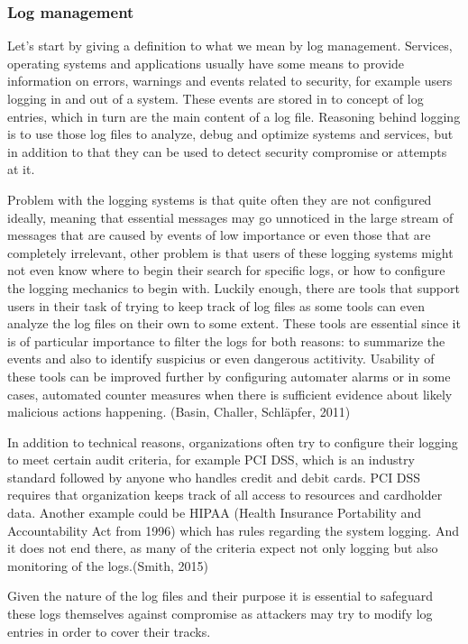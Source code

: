 \documentclass{article}
\begin{document}
\subsubsection{Log management}
Let's start by giving a definition to what we mean by log management. Services, operating systems and applications usually have some means to provide information on errors, warnings and events related to security, for example users logging in and out of a system. These events are stored in to concept of log entries, which in turn are the main content of a log file. Reasoning behind logging is to use those log files to analyze, debug and optimize systems and services, but in addition to that they can be used to detect security compromise or attempts at it.
\par
Problem with the logging systems is that quite often they are not configured ideally, meaning that essential messages may go unnoticed in the large stream of messages that are caused by events of low importance or even those that are completely irrelevant, other problem is that users of these logging systems might not even know where to begin their search for specific logs, or how to configure the logging mechanics to begin with. Luckily enough, there are tools that support users in their task of trying to keep track of log files as some tools can even analyze the log files on their own to some extent. These tools are essential since it is of particular importance to filter the logs for both reasons: to summarize the events and also to identify suspicius or even dangerous actitivity. Usability of these tools can be improved further by configuring automater alarms or in some cases, automated counter measures when there is sufficient evidence about likely malicious actions happening. (Basin, Challer, Schläpfer, 2011)
\par
In addition to technical reasons, organizations often try to configure their logging to meet certain audit criteria, for example PCI DSS, which is an industry standard followed by anyone who handles credit and debit cards. PCI DSS requires that organization keeps track of all access to resources and cardholder data. Another example could be HIPAA (Health Insurance Portability and Accountability Act from 1996) which has rules regarding the system logging. And it does not end there, as many of the criteria expect not only logging but also monitoring of the logs.(Smith, 2015)
\par
Given the nature of the log files and their purpose it is essential to safeguard these logs themselves against compromise as attackers may try to modify log entries in order to cover their tracks.
\end{document}
